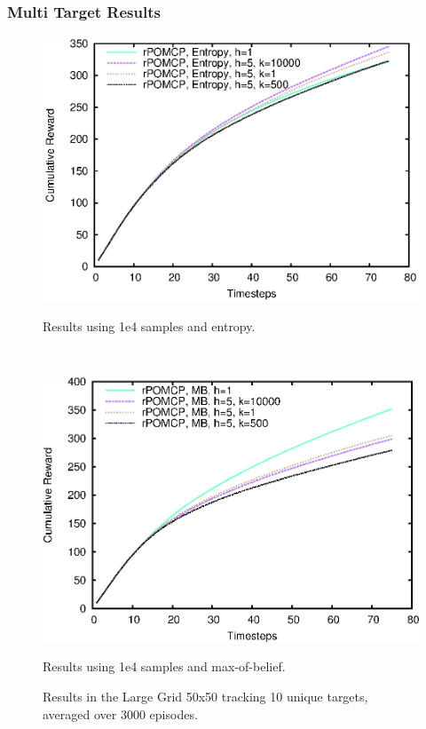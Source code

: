 \documentclass[xcolor={dvipsnames}]{beamer}
\begin{document}
\begin{frame}
    \frametitle{Multi Target Results}

\begin{figure}[ht]
        \centering
        \begin{minipage}[t]{0.5\textwidth}
                \includegraphics[width=\textwidth]{../images/Images/CameraPathResults/Big_50x50/Multi/E/output}
                \caption{Results using 1e4 samples and entropy.}
                \label{fig:cpb4e10}
        \end{minipage}%
        ~ %
        \begin{minipage}[t]{0.5\textwidth}
                \includegraphics[width=\textwidth]{../images/Images/CameraPathResults/Big_50x50/Multi/MB/output}
                \caption{Results using 1e4 samples and max-of-belief.}
                \label{fig:cpb5mb10}
        \end{minipage}
        \caption{Results in the Large Grid 50x50 tracking 10 unique targets, averaged over 3000 episodes.}\label{fig:cpb10}
\end{figure}
\end{frame}
\end{document}
